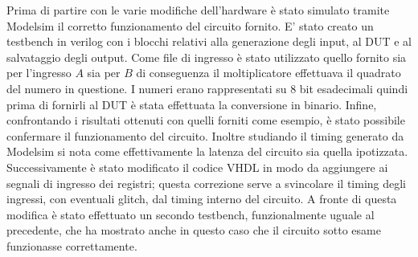 Prima di partire con le varie modifiche dell'hardware è stato simulato tramite Modelsim il corretto funzionamento del circuito fornito. E' stato creato un testbench in verilog con i blocchi relativi alla generazione degli input, al DUT e al salvataggio degli output.
Come file di ingresso è stato utilizzato quello fornito sia per l'ingresso $A$ sia per $B$ di conseguenza il moltiplicatore effettuava il quadrato del numero in questione. I numeri erano rappresentati su 8 bit esadecimali quindi prima di fornirli al DUT è stata effettuata la conversione in binario.
Infine, confrontando i risultati ottenuti con quelli forniti come esempio, è stato possibile confermare il funzionamento del circuito. Inoltre studiando il timing generato da Modelsim si nota come effettivamente la latenza del circuito sia quella ipotizzata.
\\
Successivamente è stato modificato il codice VHDL in modo da aggiungere ai segnali di ingresso dei registri; questa correzione serve a svincolare il timing degli ingressi, con eventuali glitch, dal timing interno del circuito.
A fronte di questa modifica è stato effettuato un secondo testbench, funzionalmente uguale al precedente, che ha mostrato anche in questo caso che il circuito sotto esame funzionasse correttamente.


